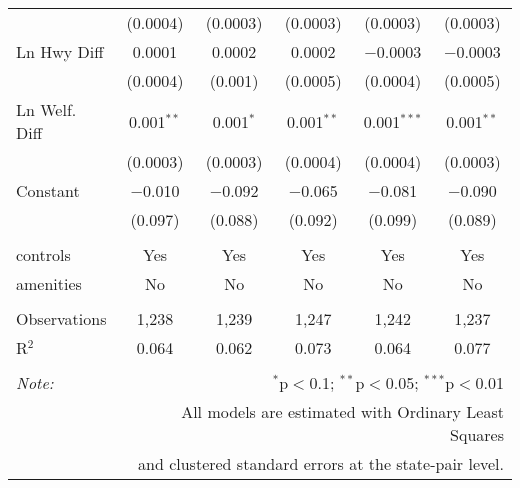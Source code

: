\begin{table}[!htbp]
\begin{tabular}{@{\extracolsep{5pt}}lccccc}
  & (0.0004) & (0.0003) & (0.0003) & (0.0003) & (0.0003) \\ 
  Ln Hwy Diff & 0.0001 & 0.0002 & 0.0002 & $-$0.0003 & $-$0.0003 \\ 
  & (0.0004) & (0.001) & (0.0005) & (0.0004) & (0.0005) \\ 
  Ln Welf. Diff & 0.001$^{**}$ & 0.001$^{*}$ & 0.001$^{**}$ & 0.001$^{***}$ & 0.001$^{**}$ \\ 
  & (0.0003) & (0.0003) & (0.0004) & (0.0004) & (0.0003) \\ 
  Constant & $-$0.010 & $-$0.092 & $-$0.065 & $-$0.081 & $-$0.090 \\ 
  & (0.097) & (0.088) & (0.092) & (0.099) & (0.089) \\ 
 \hline \\[-1.8ex] 
controls & Yes & Yes & Yes & Yes & Yes \\ 
amenities & No & No & No & No & No \\ 
\hline \\[-1.8ex] 
Observations & 1,238 & 1,239 & 1,247 & 1,242 & 1,237 \\ 
R$^{2}$ & 0.064 & 0.062 & 0.073 & 0.064 & 0.077 \\ 
\hline 
\hline \\[-1.8ex] 
\textit{Note:}  & \multicolumn{5}{r}{$^{*}$p$<$0.1; $^{**}$p$<$0.05; $^{***}$p$<$0.01} \\ 
 & \multicolumn{5}{r}{All models are estimated with Ordinary Least Squares} \\ 
 & \multicolumn{5}{r}{and clustered standard errors at the state-pair level.} \\ 
\end{tabular} 
\end{table} 
